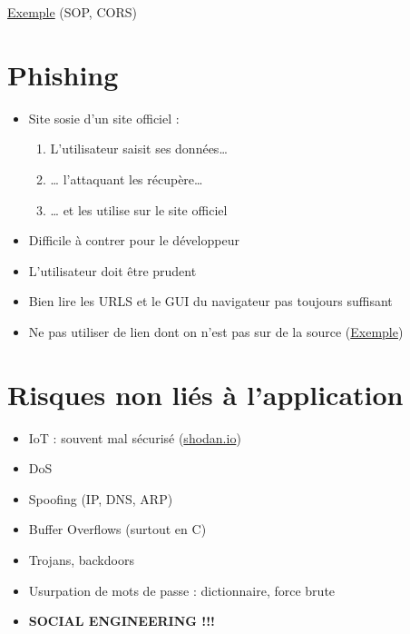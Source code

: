 \href{https://www.owasp.org/index.php/CSRF}{Exemple} (SOP, CORS)

\hypertarget{phishing}{%
\section{Phishing}\label{phishing}}

\begin{itemize}
\tightlist
\item
  Site sosie d'un site officiel :

  \begin{enumerate}
  \def\labelenumi{\arabic{enumi}.}
  \tightlist
  \item
    L'utilisateur saisit ses données\ldots{}
  \item
    \ldots{} l'attaquant les récupère\ldots{}
  \item
    \ldots{} et les utilise sur le site officiel
  \end{enumerate}
\item
  Difficile à contrer pour le développeur
\item
  L'utilisateur doit être prudent
\item
  Bien lire les URLS et le GUI du navigateur pas toujours suffisant
\item
  Ne pas utiliser de lien dont on n'est pas sur de la source
  (\href{https://www.xudongz.com/blog/2017/idn-phishing/}{Exemple})
\end{itemize}

\hypertarget{risques-non-liuxe9s-uxe0-lapplication}{%
\section{Risques non liés à
l'application}\label{risques-non-liuxe9s-uxe0-lapplication}}

\begin{itemize}
\tightlist
\item
  IoT : souvent mal sécurisé (\href{https://www.shodan.io/}{shodan.io})
\item
  DoS
\item
  Spoofing (IP, DNS, ARP)
\item
  Buffer Overflows (surtout en C)
\item
  Trojans, backdoors
\item
  Usurpation de mots de passe : dictionnaire, force brute
\item
  \textbf{SOCIAL ENGINEERING !!!}
\end{itemize}

